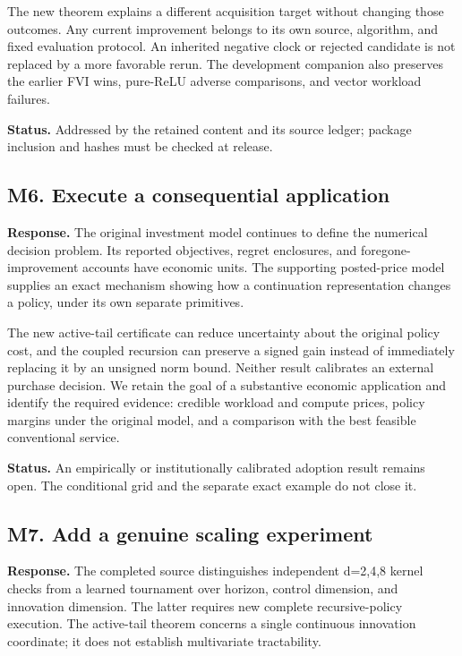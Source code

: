 The new theorem explains a different acquisition target without changing those outcomes. Any current improvement belongs to its own source, algorithm, and fixed evaluation protocol. An inherited negative clock or rejected candidate is not replaced by a more favorable rerun. The development companion also preserves the earlier FVI wins, pure-ReLU adverse comparisons, and vector workload failures.

\textbf{Status.} Addressed by the retained content and its source ledger; package inclusion and hashes must be checked at release.

\hypertarget{m6.-execute-a-consequential-application}{%
\subsection{M6. Execute a consequential application}\label{m6.-execute-a-consequential-application}}

\textbf{Response.} The original investment model continues to define the numerical decision problem. Its reported objectives, regret enclosures, and foregone-improvement accounts have economic units. The supporting posted-price model supplies an exact mechanism showing how a continuation representation changes a policy, under its own separate primitives.

The new active-tail certificate can reduce uncertainty about the original policy cost, and the coupled recursion can preserve a signed gain instead of immediately replacing it by an unsigned norm bound. Neither result calibrates an external purchase decision. We retain the goal of a substantive economic application and identify the required evidence: credible workload and compute prices, policy margins under the original model, and a comparison with the best feasible conventional service.

\textbf{Status.} An empirically or institutionally calibrated adoption result remains open. The conditional grid and the separate exact example do not close it.

\hypertarget{m7.-add-a-genuine-scaling-experiment}{%
\subsection{M7. Add a genuine scaling experiment}\label{m7.-add-a-genuine-scaling-experiment}}

\textbf{Response.} The completed source distinguishes independent d=2,4,8 kernel checks from a learned tournament over horizon, control dimension, and innovation dimension. The latter requires new complete recursive-policy execution. The active-tail theorem concerns a single continuous innovation coordinate; it does not establish multivariate tractability.

